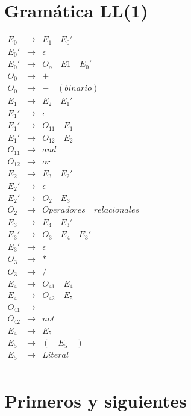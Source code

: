 \documentclass{article}
\begin{document}
\newpage

\section{Gramática LL(1)}

$
\begin{array}{lcl}
E_0 & \rightarrow & E_1\quad E_0'  \\
E_0' & \rightarrow & \epsilon \\
E_0' & \rightarrow & O_o\quad E1\quad E_0' \\
O_0 & \rightarrow & + \\
O_0 & \rightarrow & -\quad (binario) \\
E_1 & \rightarrow & E_2\quad E_1' \\
E_1' & \rightarrow & \epsilon \\
E_1' & \rightarrow & O_{11}\quad E_{1}\\
E_1' & \rightarrow & O_{12}\quad E_{2}\\
O_{11} & \rightarrow & and \\
O_{12} & \rightarrow & or \\
E_2 & \rightarrow & E_3\quad E_2'\\
E_2' & \rightarrow & \epsilon \\
E_2' & \rightarrow & O_2\quad E_3 \\
O_2 & \rightarrow & Operadores\quad relacionales \\
E_3 & \rightarrow & E_4\quad E_3' \\
E_3' & \rightarrow & O_3\quad E_4\quad E_3'\\
E_3' & \rightarrow & \epsilon \\
O_3 & \rightarrow & * \\
O_3 & \rightarrow & / \\
E_4 & \rightarrow & O_{41}\quad E_4 \\
E_4 & \rightarrow & O_{42}\quad E_5 \\
O_{41} & \rightarrow & - \\
O_{42} & \rightarrow & not \\
E_4 & \rightarrow & E_5 \\
E_5 & \rightarrow & (\quad E_5 \quad) \\
E_5 & \rightarrow & Literal \\
\end{array}
$

\newpage 

\section{Primeros y siguientes}
\end{document}
